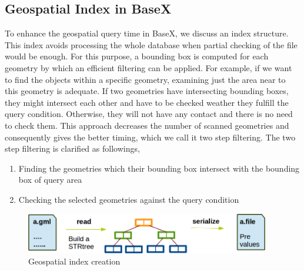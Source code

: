 \documentclass[a4paper,12pt]{article}
\begin{document}
\subsection{Geospatial Index in BaseX}
\label{indexBX}
To enhance the geospatial query time in BaseX, we discuss an index structure. This index avoids processing the whole database when partial checking of the file would be enough. For this purpose, a bounding box is computed for each geometry by which an efficient filtering can be applied. For example, if we want to find the objects within a specific geometry, examining just the area near to this geometry is adequate. If two geometries have intersecting bounding boxes, they might intersect each other and have to be checked weather they fulfill the query condition. Otherwise, they will not have any contact and there is no need to check them. This approach decreases the number of scanned geometries and consequently gives the better timing, which we call it two step filtering. The two step filtering is clarified as followings,
\begin{enumerate}
\item Finding the geometries which their bounding box intersect with the bounding box of query area
\item Checking the selected geometries against the query condition
\end{enumerate}


 \begin{figure}
\centering
\includegraphics[width=0.95\textwidth]{IndexinFile}
\caption{Geospatial index creation}
\label{figIndexinFile}
\end{figure}
\end{document}
